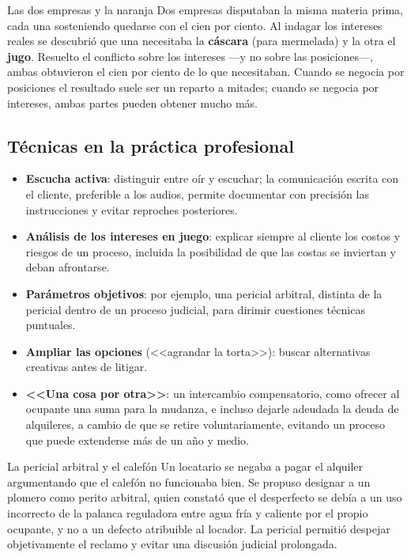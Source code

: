 \documentclass[12pt,oneside]{book}
\begin{document}
\begin{example}{Las dos empresas y la naranja}
Dos empresas disputaban la misma materia prima, cada una sosteniendo quedarse con el cien por ciento. Al indagar los intereses reales se descubrió que una necesitaba la \textbf{cáscara} (para mermelada) y la otra el \textbf{jugo}. Resuelto el conflicto sobre los intereses ---y no sobre las posiciones---, ambas obtuvieron el cien por ciento de lo que necesitaban. Cuando se negocia por posiciones el resultado suele ser un reparto a mitades; cuando se negocia por intereses, ambas partes pueden obtener mucho más.
\end{example}

\subsection{Técnicas en la práctica profesional}

\begin{itemize}
\item \textbf{Escucha activa}: distinguir entre oír y escuchar; la comunicación escrita con el cliente, preferible a los audios, permite documentar con precisión las instrucciones y evitar reproches posteriores.
\item \textbf{Análisis de los intereses en juego}: explicar siempre al cliente los costos y riesgos de un proceso, incluida la posibilidad de que las costas se inviertan y deban afrontarse.
\item \textbf{Parámetros objetivos}: por ejemplo, una pericial arbitral, distinta de la pericial dentro de un proceso judicial, para dirimir cuestiones técnicas puntuales.
\item \textbf{Ampliar las opciones} (<<agrandar la torta>>): buscar alternativas creativas antes de litigar.
\item \textbf{<<Una cosa por otra>>}: un intercambio compensatorio, como ofrecer al ocupante una suma para la mudanza, e incluso dejarle adeudada la deuda de alquileres, a cambio de que se retire voluntariamente, evitando un proceso que puede extenderse más de un año y medio.
\end{itemize}

\begin{example}{La pericial arbitral y el calefón}
Un locatario se negaba a pagar el alquiler argumentando que el calefón no funcionaba bien. Se propuso designar a un plomero como perito arbitral, quien constató que el desperfecto se debía a un uso incorrecto de la palanca reguladora entre agua fría y caliente por el propio ocupante, y no a un defecto atribuible al locador. La pericial permitió despejar objetivamente el reclamo y evitar una discusión judicial prolongada.
\end{example}
\end{document}
